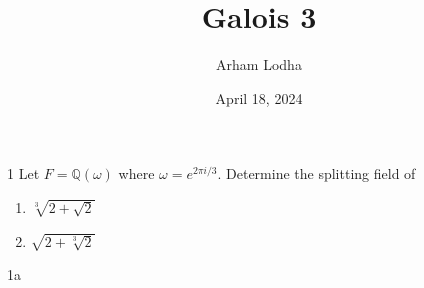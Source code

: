 \documentclass{article}
\newcommand{\Q}{\mathbb{Q}}
\begin{document}
\title{Galois 3}
\author{Arham Lodha}%
\date{April 18, 2024}%
\maketitle

\begin{PROB}{1}\label{Problem 1.}
    Let $F = \Q(\omega)$ where $\omega = e^{2 \pi i / 3}$. Determine the splitting field of 
    
    \begin{enumerate}
        \item $\sqrt[3]{2 + \sqrt{2}}$ 
        \item $\sqrt{2 + \sqrt[3]{2}}$ 
    \end{enumerate}
    
\end{PROB}
\begin{PROB}{1a}\label{Problem 1a.}
\end{PROB}
\end{document}
